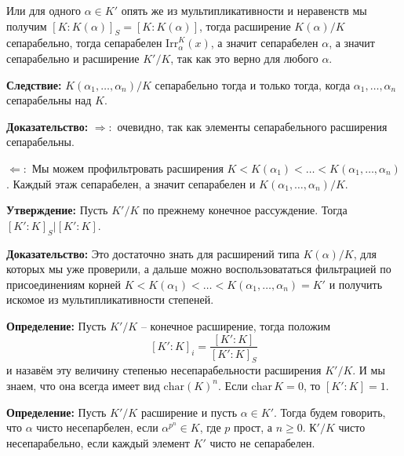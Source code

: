 \documentclass[a4paper, 12pt]{book}
\begin{document}
Или для одного $\alpha\in K'$ опять же из мультипликативности и неравенств мы
получим $[K:K(\alpha)]_S=[K:K(\alpha)]$, тогда расширение $K(\alpha)/K$
сепарабельно, тогда сепарабелен $\text{Irr}_\alpha^K(x)$, а значит сепарабелен
$\alpha$, а значит сепарабельно и расширение $K'/K$, так как это верно для
любого $\alpha$.

\textbf{Следствие:} $K(\alpha_1,\ldots,\alpha_n)/K$ сепарабельно тогда и только
тогда, когда $\alpha_1,\ldots,\alpha_n$ сепарабельны над $K$.

\textbf{Доказательство:} $\Rightarrow:$ очевидно, так как элементы
сепарабельного расширения сепарабельны.

$\Leftarrow:$ Мы можем профильтровать расширения $K<K(\alpha_1)<\ldots<K(\alpha_1,
\ldots,\alpha_n)$. Каждый этаж сепарабелен, а значит сепарабелен и $K(\alpha_1,
\ldots,\alpha_n)/K$.

\textbf{Утверждение:} Пусть $K'/K$ по прежнему конечное рассуждение. Тогда
$[K':K]_S | [K':K]$.

\textbf{Доказательство:} Это достаточно знать для расширений типа $K(\alpha)/K$,
для которых мы уже проверили, а дальше можно воспользовататься фильтрацией по
присоединениям корней $K<K(\alpha_1)<\ldots<K(\alpha_1,\ldots,\alpha_n)=K'$ и
получить искомое из мультипликативности степеней.

\textbf{Определение:} Пусть $K'/K$ – конечное расширение, тогда положим
\[[K':K]_i=\frac{[K':K]}{[K':K]_S}\]
и назавём эту величину степенью несепарабельности расширения $K'/K$. И мы знаем,
что она всегда имеет вид $\text{char}(K)^n$. Если $\text{char}\,K=0$, то $[K':K]
=1$.

\textbf{Определение:} Пусть $K'/K$ расширение и пусть $\alpha\in K'$. Тогда
будем говорить, что $\alpha$ чисто несепарбелен, если $\alpha^{p^n}\in K$, где
$p$ прост, а $n\geq 0$. $К'/K$ чисто несепарабельно, если каждый элемент $K'$ чисто не
сепарабелен.
\end{document}
